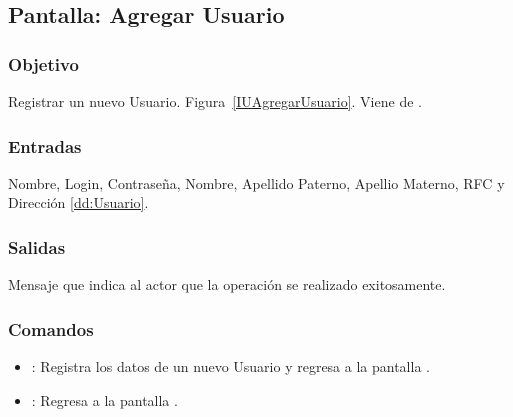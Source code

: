\subsection{Pantalla: Agregar Usuario}
\subsubsection{Objetivo}
Registrar un nuevo Usuario. Figura~\ref{IUAgregarUsuario}. Viene de .




\subsubsection{Entradas}
Nombre, Login, Contraseña, Nombre, Apellido Paterno, Apellio Materno, RFC y Dirección \ref{dd:Usuario}.

\subsubsection{Salidas}
Mensaje que indica al actor que la operación se realizado exitosamente.

\subsubsection{Comandos}
\begin{itemize}
 \item {}: Registra los datos de un nuevo Usuario y regresa a la pantalla .
 \item {}: Regresa a la pantalla .
\end{itemize}





